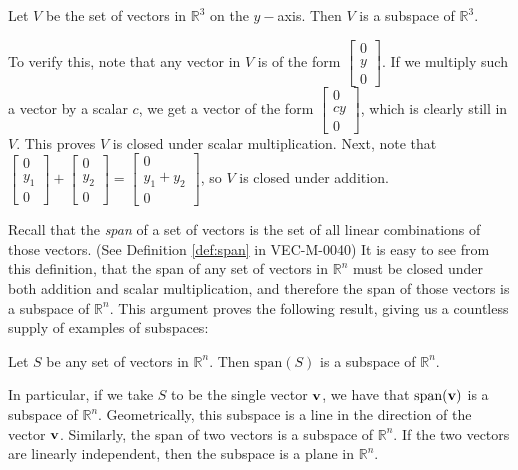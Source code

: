 \documentclass{ximera}
\renewcommand{\vec}[1]{{\bf #1}}
\newcommand{\RR}{\mathbb{R}}
\newcommand{\dfn}{\textit}
\begin{document}
\begin{example} \label{y-axis_subspace}
Let $V$ be the set of vectors in $\RR^3$ on the $y-$axis.  Then $V$ is a subspace of $\RR^3$.  

\begin{explanation}
To verify this, note that any vector in $V$ is of the form $\begin{bmatrix}0\\y\\0 \end{bmatrix}$.  If we multiply such a vector by a scalar $c$, we get a vector of the form $\begin{bmatrix}0\\cy\\0 \end{bmatrix}$, which is clearly still in $V$.  This proves $V$ is closed under scalar multiplication.  Next, note that $\begin{bmatrix}0\\y_1\\0 \end{bmatrix} + \begin{bmatrix}0\\y_2\\0 \end{bmatrix}= \begin{bmatrix}0\\y_1 + y_2\\0\end{bmatrix}$, so $V$ is closed under addition.
\end{explanation}
\end{example}

Recall that the \dfn{span} of a set of vectors is the set of all linear combinations of those vectors. (See Definition \ref{def:span} in VEC-M-0040)  It is easy to see from this definition, that the span of any set of vectors in $\RR^n$ must be closed under both addition and scalar multiplication, and therefore the span of those vectors is a subspace of $\RR^n$.  This argument proves the following result, giving us a countless supply of examples of subspaces:

\begin{theorem} \label{th:span_is_subspace}
Let $S$ be any set of vectors in $\RR^n$.  Then $\text{span}(S)$ is a subspace of $\RR^n$.
\end{theorem}

In particular, if we take $S$ to be the single vector $\vec{v}$, we have that $\text{span}(\vec{v})$ is a subspace of $\RR^n$.  Geometrically, this subspace is a line in the direction of the vector $\vec{v}$.  Similarly, the span of two vectors is a subspace of $\RR^n$.  If the two vectors are linearly independent, then the subspace is a plane in $\RR^n$. 
\end{document}
